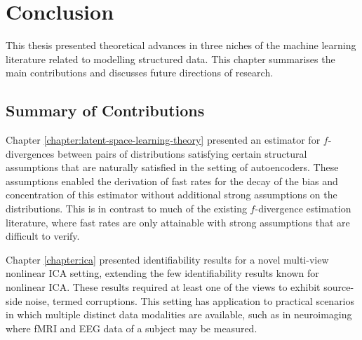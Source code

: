 \chapter{Conclusion}\label{chapter:conclusion}

\ifpdf
    \graphicspath{{Chapter7/Figs/Raster/}{Chapter7/Figs/PDF/}{Chapter7/Figs/}}
\else
    \graphicspath{{Chapter7/Figs/Vector/}{Chapter7/Figs/}}
\fi

This thesis presented theoretical advances in three niches of the machine learning literature related to modelling structured data.
This chapter summarises the main contributions and discusses future directions of research.

\section{Summary of Contributions}

Chapter \ref{chapter:latent-space-learning-theory} presented an estimator for $f$-divergences between pairs of distributions satisfying certain structural assumptions that are naturally satisfied in the setting of autoencoders. 
These assumptions enabled the derivation of fast rates for the decay of the bias and concentration of this estimator without additional strong assumptions on the distributions.
This is in contrast to much of the existing $f$-divergence estimation literature, where fast rates are only attainable with strong assumptions that are difficult to verify.


Chapter \ref{chapter:ica} presented identifiability results for a novel multi-view nonlinear ICA setting, extending the few identifiability results known for nonlinear ICA.
These results required at least one of the views to exhibit source-side noise, termed corruptions.
This setting has application to practical scenarios in which multiple distinct data modalities are available, such as in neuroimaging where fMRI and EEG data of a subject may be measured.


